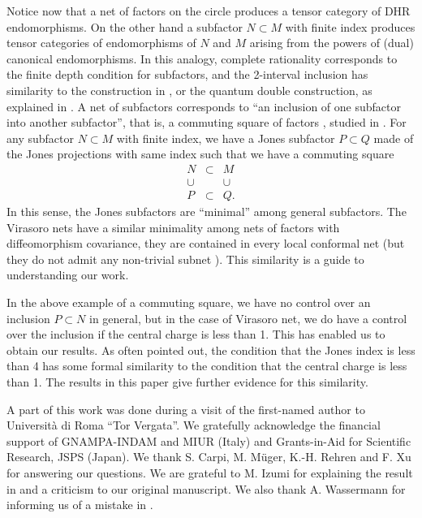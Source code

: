 \documentclass[12pt]{article}
\begin{document}
Notice now that a net of factors on the circle
produces a tensor category of DHR endomorphisms.  
On the other hand a subfactor $N\subset M$ with
finite index produces tensor categories of endomorphisms of $N$ and $M$
arising from the powers of (dual) canonical endomorphisms.  
In this analogy, complete rationality corresponds to 
the finite depth condition for subfactors,
and the 2-interval inclusion has similarity to the 
construction in \cite{LR},
or the quantum double construction, as explained in \cite{KLM}.
A net of subfactors corresponds to ``an inclusion
of one subfactor into another subfactor'', that is,
a commuting square of factors \cite{P1}, studied in \cite{K2}.
For any subfactor $N\subset M$ with finite index, we have a Jones
subfactor $P\subset Q$ made of the Jones projections
with same index \cite{J} such that we have a commuting square
$$\begin{array}{ccc}
N & \subset & M \\
\cup && \cup \\
P & \subset & Q.
\end{array}$$
In this sense, the Jones subfactors are ``minimal'' among general
subfactors.  The Virasoro nets have a similar minimality among nets
of factors with diffeomorphism covariance, 
they are contained in every local 
conformal net (but they do not admit any non-trivial subnet \cite{C}).
This similarity is a guide to understanding our work.

In the above example of a commuting
square, we have no control over an inclusion $P\subset N$ in general, but
in the case of Virasoro net, we do have a control over the inclusion
if the central charge is less than 1.  This has enabled us to obtain our
results.  As often pointed out, the
condition that the Jones index is less than 4 has some formal
similarity to the condition that the central charge is less than 1.
The results in this paper give further evidence for this similarity.

\medskip
{}
A part of this work was done during a visit of the first-named
author to Universit\`a di Roma ``Tor Vergata''.
We gratefully acknowledge the financial support of 
GNAMPA-INDAM and MIUR (Italy) and 
Grants-in-Aid for Scientific Research, JSPS (Japan).
We thank S. Carpi, M. M\"uger, K.-H. Rehren
and F. Xu for answering our questions.  We are grateful to
M. Izumi for explaining the result in \cite{IK} and 
a criticism to our original manuscript.
We also thank A. Wassermann for informing us of a mistake
in \cite{Lk}.
\end{document}
